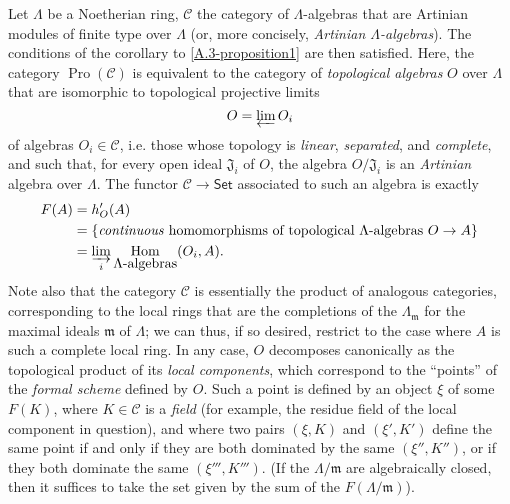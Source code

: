 \documentclass{article}
\theoremstyle{plain}
\theoremstyle{definition}
\newcommand{\cat}[1]{{\mathcal{#1}}}
\newcommand{\fk}[1]{{\mathfrak{#1}}}
\newcommand{\Set}{\mathsf{Set}}
\DeclareMathOperator{\Hom}{Hom}
\DeclareMathOperator{\Pro}{Pro}
\newcommand{\oldpage}[1]{\marginpar{\footnotesize$\Big\vert$ \textit{p.~#1}}}
\begin{document}
Let $\Lambda$ be a Noetherian ring, $\cat{C}$ the category of $\Lambda$-algebras that are Artinian modules of finite type over $\Lambda$ (or, more concisely,
\oldpage{195-07}
\emph{Artinian $\Lambda$-algebras}).
The conditions of the corollary to \cref{A.3-proposition1} are then satisfied.
Here, the category $\Pro(\cat{C})$ is equivalent to the category of \emph{topological algebras} $O$ over $\Lambda$ that are isomorphic to topological projective limits
\[
  O = \varprojlim O_i
\]
of algebras $O_i\in\cat{C}$, i.e. those whose topology is \emph{linear}, \emph{separated}, and \emph{complete}, and such that, for every open ideal $\fk{J}_i$ of $O$, the algebra $O/\fk{J}_i$ is an \emph{Artinian} algebra over $\Lambda$.
The functor $\cat{C}\to\Set$ associated to such an algebra is exactly
\[
  \begin{aligned}
    F(A)
    &= h'_{O}(A)
  \\&= \{\mbox{\emph{continuous} homomorphisms of topological $\Lambda$-algebras $O\to A$}\}
  \\&= \varinjlim_i \Hom_{\mbox{$\Lambda$-algebras}}(O_i,A).
  \end{aligned}
\]
Note also that the category $\cat{C}$ is essentially the product of analogous categories, corresponding to the local rings that are the completions of the $\Lambda_{\fk{m}}$ for the maximal ideals $\fk{m}$ of $\Lambda$;
we can thus, if so desired, restrict to the case where $A$ is such a complete local ring.
In any case, $O$ decomposes canonically as the topological product of its \emph{local components}, which correspond to the ``points'' of the \emph{formal scheme} \cite{2} defined by $O$.
Such a point is defined by an object $\xi$ of some $F(K)$, where $K\in\cat{C}$ is a \emph{field} (for example, the residue field of the local component in question), and where two pairs $(\xi,K)$ and $(\xi',K')$ define the same point if and only if they are both dominated by the same $(\xi'',K'')$, or if they both dominate the same $(\xi''',K''')$.
(If the $\Lambda/\fk{m}$ are algebraically closed, then it suffices to take the set given by the sum of the $F(\Lambda/\fk{m})$).
\end{document}
